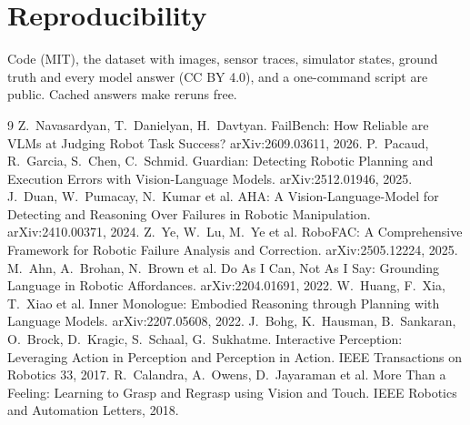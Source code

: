 \documentclass[10pt,twocolumn]{article}
\begin{document}
\section{Reproducibility}
Code (MIT), the dataset with images, sensor traces, simulator states, ground truth and every model answer (CC BY 4.0), and a one-command script are public. Cached answers make reruns free.

\begin{thebibliography}{9}\small
{} Z.~Navasardyan, T.~Danielyan, H.~Davtyan. FailBench: How Reliable are VLMs at Judging Robot Task Success? arXiv:2609.03611, 2026.
 P.~Pacaud, R.~Garcia, S.~Chen, C.~Schmid. Guardian: Detecting Robotic Planning and Execution Errors with Vision-Language Models. arXiv:2512.01946, 2025.
 J.~Duan, W.~Pumacay, N.~Kumar et al. AHA: A Vision-Language-Model for Detecting and Reasoning Over Failures in Robotic Manipulation. arXiv:2410.00371, 2024.
 Z.~Ye, W.~Lu, M.~Ye et al. RoboFAC: A Comprehensive Framework for Robotic Failure Analysis and Correction. arXiv:2505.12224, 2025.
 M.~Ahn, A.~Brohan, N.~Brown et al. Do As I Can, Not As I Say: Grounding Language in Robotic Affordances. arXiv:2204.01691, 2022.
 W.~Huang, F.~Xia, T.~Xiao et al. Inner Monologue: Embodied Reasoning through Planning with Language Models. arXiv:2207.05608, 2022.
 J.~Bohg, K.~Hausman, B.~Sankaran, O.~Brock, D.~Kragic, S.~Schaal, G.~Sukhatme. Interactive Perception: Leveraging Action in Perception and Perception in Action. IEEE Transactions on Robotics 33, 2017.
 R.~Calandra, A.~Owens, D.~Jayaraman et al. More Than a Feeling: Learning to Grasp and Regrasp using Vision and Touch. IEEE Robotics and Automation Letters, 2018.
\end{thebibliography}
\end{document}
